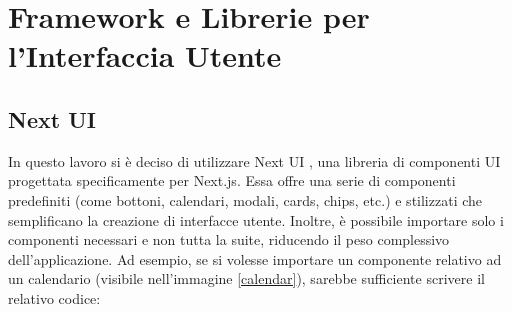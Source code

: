 \documentclass[target=bach,aauheader=,style=]{thud}
\begin{document}
\section{Framework e Librerie per l'Interfaccia Utente}

\subsection{Next UI}
In questo lavoro si è deciso di utilizzare Next UI \cite{nextui2024}, una libreria di componenti UI progettata specificamente per Next.js. Essa offre una serie di componenti predefiniti (come bottoni, calendari, modali, cards, chips, etc.) e stilizzati che semplificano la creazione di interfacce utente. Inoltre, è possibile importare solo i componenti necessari e non tutta la suite, riducendo il peso complessivo dell'applicazione. Ad esempio, se si volesse importare un componente relativo ad un calendario (visibile nell'immagine \ref{calendar}), sarebbe sufficiente scrivere il relativo codice:
\end{document}
